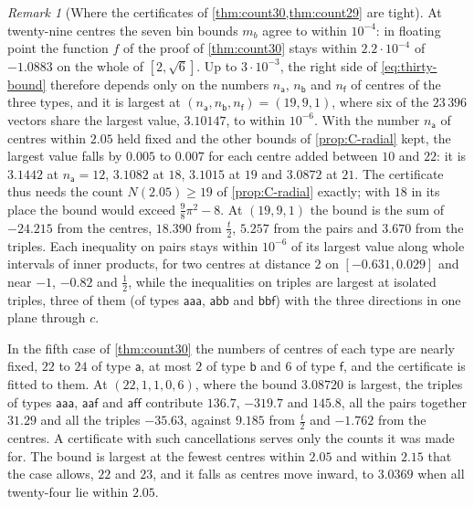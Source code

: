 \documentclass[11pt,reqno]{amsart}
\renewcommand{\_}{\origunderscore\allowbreak}
\numberwithin{equation}{section}
\theoremstyle{plain}
\theoremstyle{definition}
\theoremstyle{remark}
\newtheorem{remark}[thm]{Remark}
\begin{document}
\begin{remark}[Where the certificates of \cref{thm:count30,thm:count29} are tight]\label{rem:typed-tight}
At twenty-nine centres the seven bin bounds $m_b$ agree to within
$10^{-4}$: in floating point the function $f$ of the proof of
\cref{thm:count30} stays within $2.2\cdot10^{-4}$ of $-1.0883$ on the whole of
$[2,\sqrt6]$. Up to $3\cdot10^{-3}$, the right side of \eqref{eq:thirty-bound}
therefore depends only on the numbers $n_{\mathsf a}$, $n_{\mathsf b}$ and
$n_{\mathsf f}$ of centres of the three types, and it is largest at
$(n_{\mathsf a},n_{\mathsf b},n_{\mathsf f})=(19,9,1)$, where six of the
$23\,396$ vectors share the largest value, $3.10147$, to within $10^{-6}$. With the
number $n_{\mathsf a}$ of centres within $2.05$ held fixed and the other
bounds of \cref{prop:C-radial} kept, the largest value falls by $0.005$ to
$0.007$ for each centre added between $10$ and $22$: it is $3.1442$ at $n_{\mathsf a}=12$,
$3.1082$ at $18$, $3.1015$ at $19$ and $3.0872$ at $21$. The certificate
thus needs the count $N(2.05)\ge19$ of \cref{prop:C-radial} exactly; with
$18$ in its place the bound would exceed $\frac98\pi^2-8$. At $(19,9,1)$ the
bound is the sum of $-24.215$ from the centres, $18.390$ from $\frac t2$,
$5.257$ from the pairs and $3.670$ from the triples. Each inequality on
pairs stays within $10^{-6}$ of its largest value along whole intervals of
inner products, for two centres at distance $2$ on $[-0.631,0.029]$ and
near $-1$, $-0.82$ and $\frac12$, while the inequalities on triples are
largest at isolated triples, three of them (of types $\mathsf{aaa}$,
$\mathsf{abb}$ and $\mathsf{bbf}$) with the three directions in one plane
through $c$.

In the fifth case of \cref{thm:count30} the numbers of centres of each type
are nearly fixed, $22$ to $24$ of type $\mathsf a$, at most $2$ of type
$\mathsf b$ and $6$ of type $\mathsf f$, and the certificate is fitted to
them. At $(22,1,1,0,6)$, where the bound $3.08720$ is largest, the triples of
types $\mathsf{aaa}$, $\mathsf{aaf}$ and $\mathsf{aff}$ contribute $136.7$,
$-319.7$ and $145.8$, all the pairs together $31.29$ and all the triples
$-35.63$, against $9.185$ from $\frac t2$ and $-1.762$ from the centres. A
certificate with such cancellations serves only the counts it was made for.
The bound is largest at the fewest centres within $2.05$ and within $2.15$
that the case allows, $22$ and $23$, and it falls as centres move inward,
to $3.0369$ when all twenty-four lie within $2.05$.


\end{remark}
\end{document}
